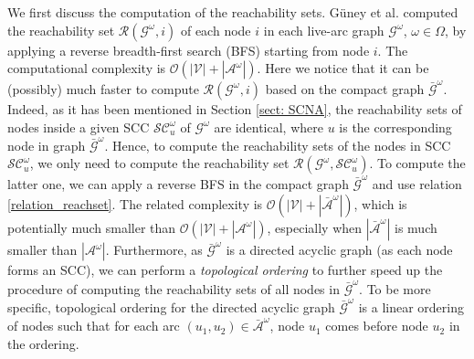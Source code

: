 \documentclass[a4paper,10pt]{article}
\newcommand{\G}{\mathcal{G}}
\theoremstyle{plain}
\newcommand{\revv}[1]{{#1}}
\begin{document}
{	
	We first discuss the computation of the reachability sets.
	G\"{u}ney et al. \cite{Guney2020} computed the reachability set $\mathcal{R}(\mathcal{{G}}^\omega, i)$ of each node $i$ in each live-arc graph $\mathcal{G}^\omega$, $\omega\in\Omega$, by applying a reverse breadth-first search (BFS) starting from node $i$.
	The computational complexity is $\mathcal{O}(|\mathcal{V}|+|\mathcal{A}^\omega|)$.
	Here we notice that it can be (possibly) much faster to compute $\mathcal{R}(\mathcal{{G}}^\omega, i)$ based on the compact graph $\mathcal{\bar{G}}^\omega$.
	Indeed, as it has been mentioned in \revv{Section} \ref{sect: SCNA}, the reachability sets of nodes inside a given SCC $\mathcal{SC}_u^\omega$ of $\G^{\omega}$ are identical, where $u$ is the corresponding node in graph $\mathcal{\bar{G}}^\omega$.
	Hence, to compute the reachability sets of the nodes in SCC $\mathcal{SC}_u^\omega$, we only need to compute the reachability set $\mathcal{R}(\mathcal{G}^\omega, \mathcal{SC}_u^\omega)$.
	To compute the latter one, we can apply a reverse BFS in the compact graph $\mathcal{\bar{G}}^\omega$
	and use relation \eqref{relation_reachset}.
	The related complexity is $\mathcal{O}(|\mathcal{V}|+|\mathcal{\bar{A}}^\omega|)$, which  is potentially much smaller than $\mathcal{O}(|\mathcal{V}|+|\mathcal{A}^\omega|)$, especially when $|\mathcal{\bar{A}}^\omega|$ is much smaller than $|\mathcal{{A}}^\omega|$.
	Furthermore, as $\bar{\mathcal{G}}^{\omega}$ is a directed acyclic graph (as each node forms an SCC),
	we can perform a \emph{topological ordering} to further speed up the procedure of computing the reachability sets of all nodes in $\bar{\mathcal{G}}^{\omega}$.
	To be more specific, topological ordering for the directed acyclic graph $\bar{\mathcal{G}}^{\omega}$ is a linear ordering of nodes such that for each arc $(u_1,u_2) \in \bar{\mathcal{A}}^{\omega}$, node $u_1$ comes before node $u_2$ in the ordering.
}
\end{document}

